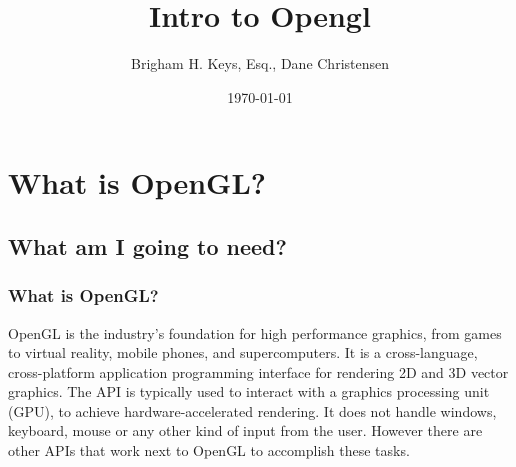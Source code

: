 \documentclass{beamer}
\title[Hello Triangle]{Intro to Opengl} %
\author{Brigham H. Keys, Esq., Dane Christensen} %
\institute[BYU-I] %
{
BYU-Idaho \\ %
\medskip
\textit{key13005@byui.edu} %
}
\date{\today} %
\begin{document}
\begin{frame}
\titlepage %
\end{frame}



\section{What is OpenGL?} %

\subsection{What am I going to need?} %

\begin{frame}
\frametitle{What is OpenGL?}
OpenGL is the industry's foundation for high performance graphics, from games to virtual reality, mobile phones, and supercomputers. It is a cross-language, cross-platform application programming interface for rendering 2D and 3D vector graphics. The API is typically used to interact with a graphics processing unit (GPU), to achieve hardware-accelerated rendering. It does not handle windows, keyboard, mouse or any other kind of input from the user. However there are other APIs that work next to OpenGL to accomplish these tasks. %
\end{frame}
\end{document}
